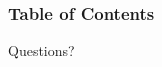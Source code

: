 \documentclass{beamer}
\begin{document}
\frame{\titlepage}

\begin{frame}
\frametitle{Table of Contents}
\tableofcontents
\end{frame}






\begin{frame}[c]
  \begin{center}
    {\huge Questions?}
  \end{center}
\end{frame}
\end{document}
